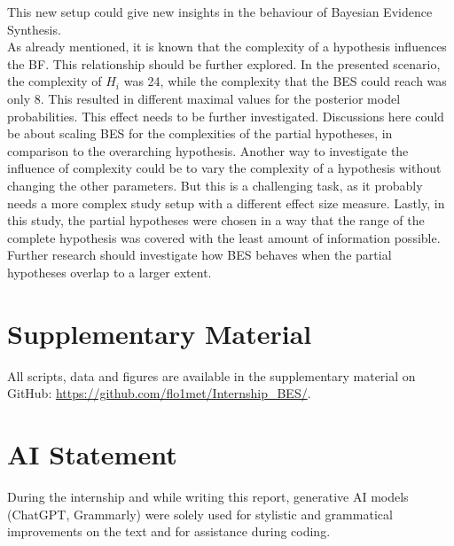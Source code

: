 \documentclass[12pt]{article}
\begin{document}
This new setup could give new insights in the behaviour of Bayesian Evidence Synthesis. \\
As already mentioned, it is known that the complexity of a hypothesis influences the BF. This relationship should be further explored. In the presented scenario, the complexity of $H_i$ was 24, while the complexity that the BES could reach was only 8. This resulted in different maximal values for the posterior model probabilities. This effect needs to be further investigated. Discussions here could be about scaling BES for the complexities of the partial hypotheses, in comparison to the overarching hypothesis. Another way to investigate the influence of complexity could be to vary the complexity of a hypothesis without changing the other parameters. But this is a challenging task, as it probably needs a more complex study setup with a different effect size measure. Lastly, in this study, the partial hypotheses were chosen in a way that the range of the complete hypothesis was covered with the least amount of information possible. Further research should investigate how BES behaves when the partial hypotheses overlap to a larger extent. 

\section*{Supplementary Material}
\label{sec:supplementary}
All scripts, data and figures are available in the supplementary material on GitHub: \url{https://github.com/flo1met/Internship_BES/}.

\section*{AI Statement}
During the internship and while writing this report, generative AI models (ChatGPT, Grammarly) were solely used for stylistic and grammatical improvements on the text and for assistance during coding.


\newpage



\end{document}
